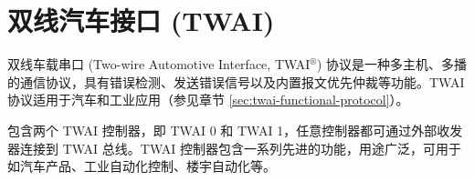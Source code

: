 \documentclass[main\_\_CN.tex]{subfiles}
\begin{document}

\ifglobal
\else
    {\let\clearpage\relax \listoftodos}
    \tableofcontents
\fi




\hypertarget{twai}{}
\chapter{双线汽车接口 (TWAI)}
\label{mod:twai}

双线车载串口 (Two-wire Automotive Interface, TWAI$^\circledR$) 协议是一种多主机、多播的通信协议，具有错误检测、发送错误信号以及内置报文优先仲裁等功能。TWAI 协议适用于汽车和工业应用（参见章节 \ref{sec:twai-functional-protocol}）。

\chipname{} 包含两个 TWAI 控制器，即 TWAI 0 和 TWAI 1，任意控制器都可通过外部收发器连接到 TWAI 总线。TWAI 控制器包含一系列先进的功能，用途广泛，可用于如汽车产品、工业自动化控制、楼宇自动化等。
\end{document}
